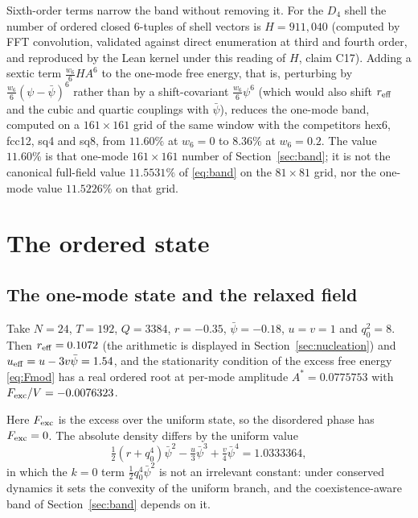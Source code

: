 \documentclass[a4paper,11pt]{article}
\numberwithin{equation}{section}
\theoremstyle{jsplain}
\theoremstyle{jsrem}
\begin{document}
Sixth-order terms narrow the band without removing it. For the $D_4$ shell the number of ordered closed $6$-tuples of shell vectors is $H=911{,}040$ (computed by FFT convolution, validated against direct enumeration at third and fourth order, and reproduced by the Lean kernel under this reading of $H$, claim C17). Adding a sextic term $\tfrac{w_6}{6}HA^6$ to the one-mode free energy, that is, perturbing by $\tfrac{w_6}{6}(\psi-\bar\psi)^6$ rather than by a shift-covariant $\tfrac{w_6}{6}\psi^6$ (which would also shift $r_{\rm eff}$ and the cubic and quartic couplings with $\bar\psi$), reduces the one-mode band, computed on a $161\times161$ grid of the same window with the competitors hex6, fcc12, sq4 and sq8, from $11.60\%$ at $w_6=0$ to $8.36\%$ at $w_6=0.2$. The value $11.60\%$ is that one-mode $161\times161$ number of Section~\ref{sec:band}; it is not the canonical full-field value $11.5531\%$ of \eqref{eq:band} on the $81\times81$ grid, nor the one-mode value $11.5226\%$ on that grid.

\section{The ordered state}\label{sec:stability}

\subsection{The one-mode state and the relaxed field}

Take $N=24$, $T=192$, $Q=3384$, $r=-0.35$, $\bar\psi=-0.18$, $u=v=1$ and $q_0^2=8$. Then $r_{\rm eff}=0.1072$ (the arithmetic is displayed in Section~\ref{sec:nucleation}) and $u_{\rm eff}=u-3v\bar\psi=1.54$, and the stationarity condition of the excess free energy \eqref{eq:Fmod} has a real ordered root at per-mode amplitude $A^*=0.0775753$ with $F_{\rm exc}/V=-0.0076323$.

Here $F_{\rm exc}$ is the excess over the uniform state, so the disordered phase has $F_{\rm exc}=0$. The absolute density differs by the uniform value
\[
\tfrac12(r+q_0^4)\bar\psi^2-\tfrac u3\bar\psi^3+\tfrac v4\bar\psi^4=1.0333364,
\]
in which the $k=0$ term $\tfrac12q_0^4\bar\psi^2$ is not an irrelevant constant: under conserved dynamics it sets the convexity of the uniform branch, and the coexistence-aware band of Section~\ref{sec:band} depends on it.
\end{document}
